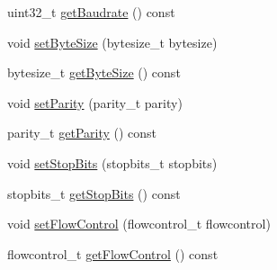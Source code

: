 \begin{DoxyCompactItemize}
\item 
uint32\+\_\+t \hyperlink{classcmd_1_1_cmd_messenger_a14c580579b5311ff78cce8de34fe63b2}{get\+Baudrate} () const 
\item 
void \hyperlink{classcmd_1_1_cmd_messenger_ae05db8b37c1b2ee9be47ea3a3bf045bd}{set\+Byte\+Size} (bytesize\+\_\+t bytesize)
\item 
bytesize\+\_\+t \hyperlink{classcmd_1_1_cmd_messenger_a8ccc24a1f621afd1e114696ed9b8b261}{get\+Byte\+Size} () const 
\item 
void \hyperlink{classcmd_1_1_cmd_messenger_ae0bbc0b786fadff310f31c84644b56c5}{set\+Parity} (parity\+\_\+t parity)
\item 
parity\+\_\+t \hyperlink{classcmd_1_1_cmd_messenger_ad487f6fd40a2bffc69fab5334d96ab52}{get\+Parity} () const 
\item 
void \hyperlink{classcmd_1_1_cmd_messenger_a06eaedc3c9e7b0b3cda7b139ee61f5bb}{set\+Stop\+Bits} (stopbits\+\_\+t stopbits)
\item 
stopbits\+\_\+t \hyperlink{classcmd_1_1_cmd_messenger_a2dd6e45584ed65ff1f744e46198e7755}{get\+Stop\+Bits} () const 
\item 
void \hyperlink{classcmd_1_1_cmd_messenger_a5271d79b0f4ae95bea5897b214fbbd4c}{set\+Flow\+Control} (flowcontrol\+\_\+t flowcontrol)
\item 
flowcontrol\+\_\+t \hyperlink{classcmd_1_1_cmd_messenger_a11e2bea7282a912fd05644b403b55503}{get\+Flow\+Control} () const 
\end{DoxyCompactItemize}


